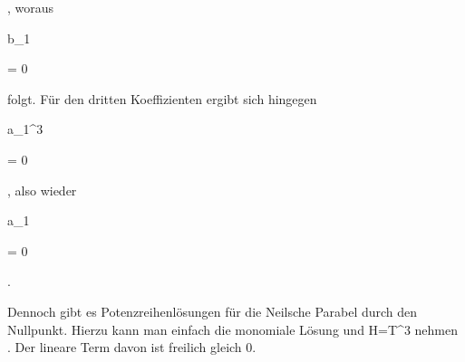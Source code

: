 {{{  }{
}

{    }{
}

{   }{
}

}
{}{}{,}
woraus


\mavergleichskette

{\vergleichskette

{b_1
}

{ = }{ 0
}

{  }{
}

{    }{
}

{   }{
}

}
{}{}{}
folgt. Für den dritten Koeffizienten ergibt sich hingegen


\mavergleichskette

{\vergleichskette

{a_1^3
}

{ = }{ 0
}

{  }{
}

{    }{
}

{   }{
}

}
{}{}{,}
also wieder


\mavergleichskette

{\vergleichskette

{a_1
}

{ = }{ 0
}

{  }{
}

{    }{
}

{   }{
}

}
{}{}{.}


Dennoch gibt es Potenzreihenlösungen für die Neilsche Parabel durch den Nullpunkt. Hierzu kann man einfach die monomiale Lösung   {  und  }  { H=T^3  }{ } nehmen
 {} {.}
Der lineare Term davon ist freilich gleich $0$.


}



{}

